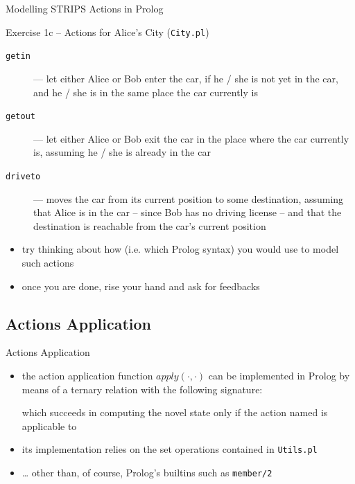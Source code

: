 \documentclass[presentation]{beamer}\mode<presentation>{\usetheme{AMSBolognaFC}}
\begin{document}
\begin{frame}[allowframebreaks]{Modelling STRIPS Actions in Prolog}
\begin{block}{Exercise 1c -- Actions for Alice's City (\texttt{City.pl})}
       \begin{description}
           \item[\texttt{getin}] --- let either Alice or Bob enter the car, if he / she is not yet in the car, and he / she is in the same place the car currently is
           \item[\texttt{getout}] --- let either Alice or Bob exit the car in the place where the car currently is, assuming he / she is already in the car
           \item[\texttt{driveto}] --- moves the car from its current position to some destination, assuming that Alice is in the car -- since Bob has no driving license -- and that the destination is reachable from the car's current position
       \end{description}
\end{block}

\begin{itemize}
    \item try thinking about \alert{how} (i.e. which Prolog syntax) you would use to model such actions

    \item once you are done, rise your hand and ask for feedbacks
\end{itemize}
\end{frame}


\subsection{Actions Application}

\begin{frame}[c]{Actions Application}

    \begin{itemize}
        \item the action application function $apply(\cdot, \cdot)$ can be implemented in Prolog by means of a ternary relation with the following signature:
        \begin{center}
        \end{center}
        which succeeds in computing the novel state  only if the action named  is applicable to 

        \vfill

        \item its implementation relies on the set operations contained in \texttt{Utils.pl}

%

        \vfill

        \item \ldots{} other than, of course, Prolog's builtins such as \texttt{member/2}
    \end{itemize}
\end{frame}
\end{document}
